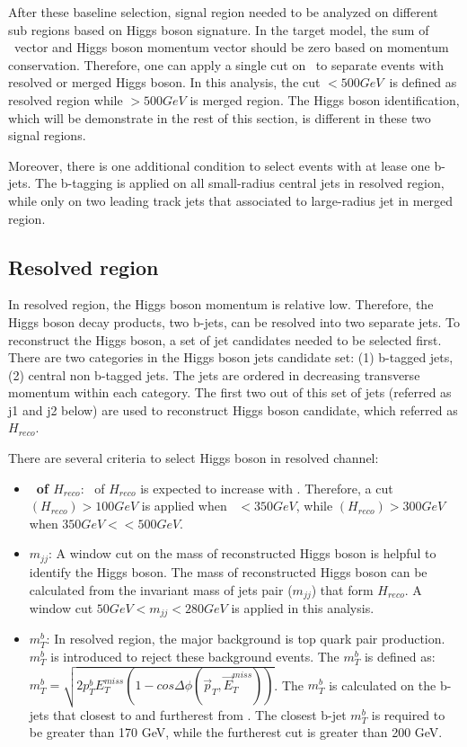 \par After these baseline selection, signal region needed to be analyzed on different sub regions based on Higgs boson signature. In the target model, the sum of \met~vector and Higgs boson momentum vector should be zero based on momentum conservation. Therefore, one can apply a single cut on \met~to separate events with resolved or merged Higgs boson. In this analysis, the cut \met$<500GeV$~is defined as resolved region while \met$>500GeV$ is merged region. The Higgs boson identification, which will be demonstrate in the rest of this section, is different in these two signal regions.
\par Moreover, there is one additional condition to select events with at lease one b-jets. The b-tagging is applied on all small-radius central jets in resolved region, while only on two leading track jets that associated to large-radius jet in merged region.

\subsection{Resolved region}

\par In resolved region, the Higgs boson momentum is relative low. Therefore, the Higgs boson decay products, two b-jets, can be resolved into two separate jets. To reconstruct the Higgs boson, a set of jet candidates needed to be selected first. There are two categories in the Higgs boson jets candidate set: (1) b-tagged jets, (2) central non b-tagged jets. The jets are ordered in decreasing transverse momentum within each category. The first two out of this set of jets (referred as j1 and j2 below) are used to reconstruct Higgs boson candidate, which referred as $H_{reco}$.

\par There are several criteria to select Higgs boson in resolved channel:

\begin{itemize}
    \item \textbf{\pt~of $H_{reco}$}: \pt~of $H_{reco}$ is expected to increase with \met. Therefore, a cut \pt$(H_{reco})>100GeV$ is applied when \met~$<350GeV$, while \pt$(H_{reco})>300GeV$ when $350GeV<$\met$<500GeV$.
    \item \textbf{$m_{jj}$}: A window cut on the mass of reconstructed Higgs boson is helpful to identify the Higgs boson. The mass of reconstructed Higgs boson can be calculated from the invariant mass of jets pair ($m_{jj}$) that form $H_{reco}$. A window cut $50GeV<m_{jj}<280GeV$ is applied in this analysis. 
    \item \textbf{$m_{T}^{b}$}: In resolved region, the major background is top quark pair production. $m_{T}^{b}$ is introduced to reject these background events. The $m_{T}^{b}$ is defined as: $m_{T}^{b}=\sqrt{2p_{T}^{b}E_{T}^{miss}(1-cos\Delta\phi(\vec{p}_{T}, \vec{E}_{T}^{miss}))}$. The $m_{T}^{b}$ is calculated on the b-jets that closest to and furtherest from \met. The closest b-jet $m_{T}^b$ is required to be greater than 170 GeV, while the furtherest cut is greater than 200 GeV.
\end{itemize}

